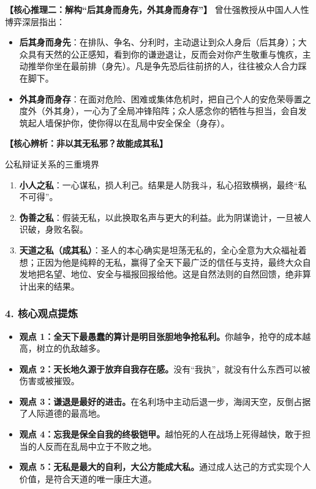 \noindent\textbf{【核心推理二：解构“后其身而身先，外其身而身存”】}
曾仕强教授从中国人人性博弈深层指出：
\begin{itemize}
    \item \textbf{后其身而身先}：在排队、争名、分利时，主动退让到众人身后（后其身）；大众具有天然的公正感知，看到你的谦逊退让，反而会对你产生敬重与愧疚，主动推举你坐在最前排（身先）。凡是争先恐后往前挤的人，往往被众人合力踩在脚下。
    \item \textbf{外其身而身存}：在面对危险、困难或集体危机时，把自己个人的安危荣辱置之度外（外其身），一心为了全局冲锋陷阵；众人感念你的牺牲与担当，会自发筑起人墙保护你，使你得以在乱局中安全保全（身存）。
\end{itemize}

\noindent\textbf{【核心辨析：非以其无私邪？故能成其私】}
\begin{DeductionBox}{公私辩证关系的三重境界}
\begin{enumerate}
    \item \textbf{小人之私}：一心谋私，损人利己。结果是人防我斗，私心招致横祸，最终“私不可得”。
    \item \textbf{伪善之私}：假装无私，以此换取名声与更大的利益。此为阴谋诡计，一旦被人识破，身败名裂。
    \item \textbf{天道之私（成其私）}：圣人的本心确实是坦荡无私的，全心全意为大众福祉着想；正因为他是纯粹的无私，赢得了全天下最广泛的信任与支持，最终大众自发地把名望、地位、安全与福报回报给他。这是自然法则的自然回馈，绝非算计出来的结果。
\end{enumerate}
\end{DeductionBox}

\subsubsection{4. 核心观点提炼}
\begin{itemize}
    \item \textbf{观点 1：全天下最愚蠢的算计是明目张胆地争抢私利。}你越争，抢夺的成本越高，树立的仇敌越多。
    \item \textbf{观点 2：天长地久源于放弃自我存在感。}没有“我执”，就没有什么东西可以被伤害或被摧毁。
    \item \textbf{观点 3：谦退是最好的进击。}在名利场中主动后退一步，海阔天空，反倒占据了人际道德的最高地。
    \item \textbf{观点 4：忘我是保全自我的终极铠甲。}越怕死的人在战场上死得越快，敢于担当的人反而在乱局中立于不败之地。
    \item \textbf{观点 5：无私是最大的自利，大公方能成大私。}通过成人达己的方式实现个人价值，是符合天道的唯一康庄大道。
\end{itemize}

